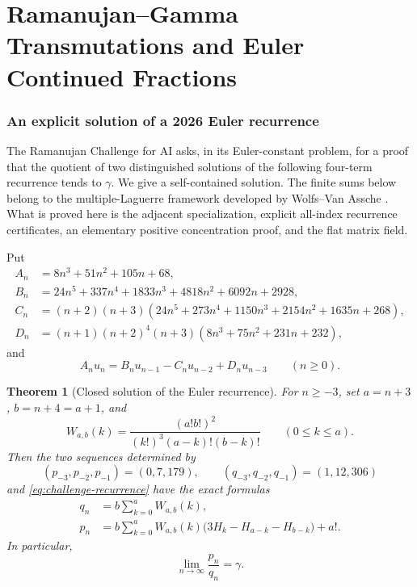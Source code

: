 \documentclass[11pt]{article}
\theoremstyle{keio}
\newtheorem{theorem}{Theorem}[section]
\theoremstyle{definition}
\theoremstyle{remark}
\begin{document}
\part{Ramanujan--Gamma Transmutations and Euler Continued Fractions}
\section{An explicit solution of a 2026 Euler recurrence}
\label{sec:ramanujan-recurrence}

The Ramanujan Challenge for AI \cite{RamanujanChallenge2026} asks, in its
Euler-constant problem, for a proof that the quotient of two distinguished
solutions of the following four-term recurrence tends to \(\gamma\).  We
give a self-contained solution.  The finite sums below belong to the
multiple-Laguerre framework developed by Wolfs--Van Assche
\cite{WolfsVanAssche2025}.  What is proved here is the adjacent
specialization, explicit all-index recurrence certificates, an elementary
positive concentration proof, and the flat matrix field.

Put
\begin{align*}
 A_n&=8n^3+51n^2+105n+68,\\
 B_n&=24n^5+337n^4+1833n^3+4818n^2+6092n+2928,\\
 C_n&=(n+2)(n+3)
 (24n^5+273n^4+1150n^3+2154n^2+1635n+268),\\
 D_n&=(n+1)(n+2)^4(n+3)
 (8n^3+75n^2+231n+232),
\end{align*}
and
\begin{equation}\label{eq:challenge-recurrence}
 A_nu_n=B_nu_{n-1}-C_nu_{n-2}+D_nu_{n-3}
 \qquad(n\ge0).
\end{equation}

\begin{theorem}[Closed solution of the Euler recurrence]
\label{thm:challenge-solution}
For \(n\ge-3\), set \(a=n+3\), \(b=n+4=a+1\), and
\begin{equation}\label{eq:Wab}
 W_{a,b}(k)=
 \frac{(a!b!)^2}{(k!)^3(a-k)!(b-k)!}
 \qquad(0\le k\le a).
\end{equation}
Then the two sequences determined by
\[
 (p_{-3},p_{-2},p_{-1})=(0,7,179),
 \qquad
 (q_{-3},q_{-2},q_{-1})=(1,12,306)
\]
and \eqref{eq:challenge-recurrence} have the exact formulas
\begin{align}
 q_n&=b\sum_{k=0}^{a}W_{a,b}(k),
 \label{eq:qn-closed}\\
 p_n&=b\sum_{k=0}^{a}W_{a,b}(k)
 \bigl(3H_k-H_{a-k}-H_{b-k}\bigr)+a!.
 \label{eq:pn-closed}
\end{align}
In particular,
\begin{equation}\label{eq:challenge-limit}
 \boxed{\displaystyle\lim_{n\to\infty}\frac{p_n}{q_n}=\gamma.}
\end{equation}
\end{theorem}
\end{document}
